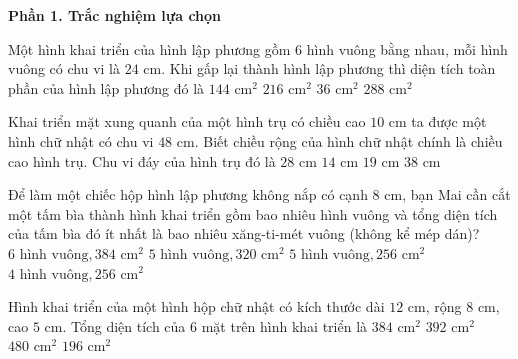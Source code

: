 \textbf{Phần 1. Trắc nghiệm lựa chọn}

\begin{ex} %
Một hình khai triển của hình lập phương gồm $6$ hình vuông bằng nhau, mỗi hình vuông có chu vi là $24\text{ cm}$. Khi gấp lại thành hình lập phương thì diện tích toàn phần của hình lập phương đó là
\choice
{$144\text{ cm}^2$}
{\True $216\text{ cm}^2$}
{$36\text{ cm}^2$}
{$288\text{ cm}^2$}
\end{ex}

\begin{ex} %
Khai triển mặt xung quanh của một hình trụ có chiều cao $10\text{ cm}$ ta được một hình chữ nhật có chu vi $48\text{ cm}$. Biết chiều rộng của hình chữ nhật chính là chiều cao hình trụ. Chu vi đáy của hình trụ đó là
\choice
{$28\text{ cm}$}
{\True $14\text{ cm}$}
{$19\text{ cm}$}
{$38\text{ cm}$}
\end{ex}

\begin{ex} %
Để làm một chiếc hộp hình lập phương không nắp có cạnh $8\text{ cm}$, bạn Mai cần cắt một tấm bìa thành hình khai triển gồm bao nhiêu hình vuông và tổng diện tích của tấm bìa đó ít nhất là bao nhiêu xăng-ti-mét vuông (không kể mép dán)?
\choice
{$6\text{ hình vuông}, 384\text{ cm}^2$}
{\True $5\text{ hình vuông}, 320\text{ cm}^2$}
{$5\text{ hình vuông}, 256\text{ cm}^2$}
{$4\text{ hình vuông}, 256\text{ cm}^2$}
\end{ex}

\begin{ex} %
Hình khai triển của một hình hộp chữ nhật có kích thước dài $12\text{ cm}$, rộng $8\text{ cm}$, cao $5\text{ cm}$. Tổng diện tích của $6$ mặt trên hình khai triển là
\choice
{$384\text{ cm}^2$}
{\True $392\text{ cm}^2$}
{$480\text{ cm}^2$}
{$196\text{ cm}^2$}
\end{ex}

